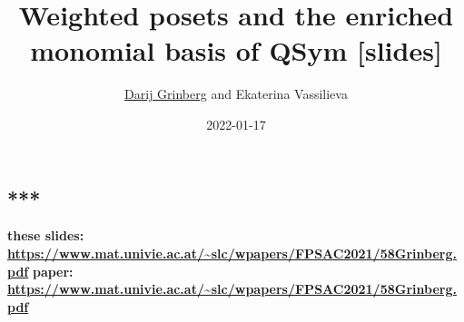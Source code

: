 \documentclass[numbers=enddot,12pt,final,onecolumn,notitlepage]{scrartcl}%
\newcommand{\0}{\phantom{c}}
\begin{document}
\title{Weighted posets and the enriched monomial basis of QSym [slides]}
\author{\href{http://www.cip.ifi.lmu.de/~grinberg/}{Darij Grinberg} and Ekaterina Vassilieva}
\date{2022-01-17}
\maketitle

\subsection*{***}

\textbf{these slides: \color{red}
\url{https://www.mat.univie.ac.at/~slc/wpapers/FPSAC2021/58Grinberg.pdf}}%
\newline\textbf{paper: \color{red}
\url{https://www.mat.univie.ac.at/~slc/wpapers/FPSAC2021/58Grinberg.pdf}}%
\newline
\end{document}
